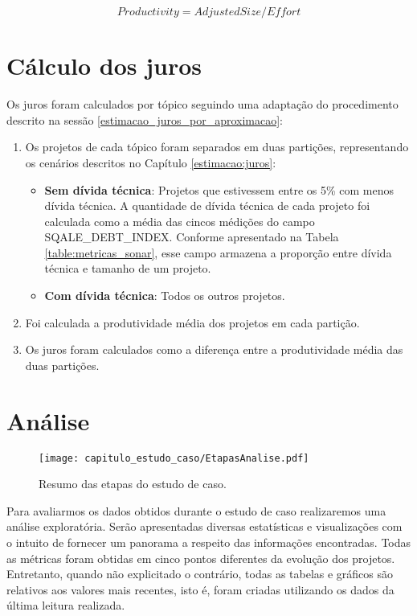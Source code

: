 \begin{equation}
\label{eq:model_capitulo_estudo}
  Productivity = AdjustedSize/Effort
\end{equation}


\section{Cálculo dos juros}


Os juros foram calculados por tópico seguindo uma adaptação do procedimento descrito na sessão \ref{estimacao_juros_por_aproximacao}:

\begin{enumerate}
\item Os projetos de cada tópico foram separados em duas partições, representando os cenários descritos no Capítulo \ref{estimacao:juros}: 
   \begin{itemize}
      \item \textbf{Sem dívida técnica}: Projetos que estivessem entre os 5\% com menos dívida técnica. A quantidade de dívida técnica de cada projeto foi calculada como a média das cincos médições do campo SQALE\_DEBT\_INDEX. Conforme apresentado na Tabela \ref{table:metricas_sonar}, esse campo armazena a proporção entre dívida técnica e tamanho de um projeto. 
      \item \textbf{Com dívida técnica}: Todos os outros projetos.
   \end{itemize}
  \item Foi calculada a produtividade média dos projetos em cada partição.
  \item Os juros foram calculados como a diferença entre a produtividade média das duas partições.
\end{enumerate}




\section{Análise}

 \begin{figure}[H]
  \centering
  \texttt{[image: capitulo\_estudo\_caso/EtapasAnalise.pdf]} 
  \caption{Resumo das etapas do estudo de caso. }
  \label{fig:cap_metodo_resumo_etapas_extracao} 
\end{figure}

Para avaliarmos os dados obtidos durante o estudo de caso realizaremos uma análise exploratória. Serão apresentadas diversas estatísticas e visualizações com o intuito de fornecer um panorama a respeito das informações encontradas. Todas as métricas foram obtidas em cinco pontos diferentes da evolução dos projetos. Entretanto,  quando não explicitado o contrário, todas as tabelas e gráficos são relativos aos valores mais recentes, isto é, foram criadas utilizando os dados da última leitura realizada. 



